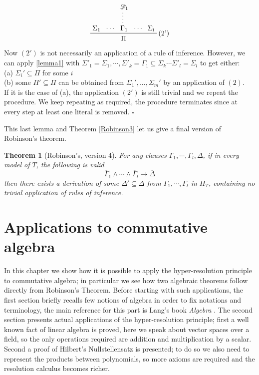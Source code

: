 \documentclass[a4paper,12pt,oneside]{book}
\newtheorem{theorem}{Theorem}[chapter]
\newcommand{\D}{\mathscr{D}}
\newcommand*{\QED}{\hfill\ensuremath{\square}}
\let\e\wedge
\begin{document}
\begin{equation*}
\prftree[r]{(2')}{\prfassumption{\Sigma_1}}{\cdots}
{\prfsummary{\D_1}{\Gamma_1}}
{\cdots}{\prfassumption{\Sigma_l}}{\Pi}
\end{equation*}
Now $(2')$ is not necessarily an application of a rule of inference. However, we can apply \ref{lemma1} with  $\Sigma'_1=\Sigma_1,\cdots, \Sigma'_k=\Gamma_1\subseteq\Sigma_k\cdots\Sigma'_l=\Sigma_l$ to get either:\\
(a) $\Sigma_i' \subseteq \Pi$ for some $i$\\
(b) some $\Pi '\subseteq\Pi$ can be obtained from $\Sigma_1 ',...,\Sigma_m '$ by an application of $(2)$.\\
If it is the case of (a), the application $(2')$ is still trivial and we repeat the procedure. We keep repeating as required, the procedure terminates since at every step at least one literal is removed. \QED



\noindent This last lemma and Theorem \ref{Robinson3}  let us give a final version of Robinson's theorem.
\begin{theorem}[{Robinson's, version 4}] \label{Robinson}
For any clauses $\Gamma_1, \cdots ,\Gamma_l , \Delta$, if in every model of $T$, the following is valid 
$$
\overline{\Gamma}_1\e\cdots\e\overline{\Gamma}_l \rightarrow \overline{\Delta}
$$
then there exists a derivation of some $\Delta' \subseteq \Delta$ from $\Gamma_1, \cdots ,\Gamma_l$ in $H_T$, containing no trivial application of rules of inference.
\end{theorem}


\chapter{Applications to commutative algebra} %
In this chapter we show how it is possible to apply the hyper-resolution principle to commutative algebra; in particular we see how two algebraic theorems follow directly from Robinson's Theorem. Before starting with such applications, the first section briefly recalls few notions of algebra in order to fix notations and terminology, the main reference for this part is Lang's book \textit{Algebra} \cite{Lang}.
The second section presents actual applications of the hyper-resolution principle; first a  well known fact of linear algebra is proved, here we speak about vector spaces over a field, so the only operations required are addition and multiplication by a scalar. 
Second a proof of Hilbert's Nullstellensatz is presented; to do so we also need to represent the products between polynomials, so more axioms are required and the resolution calculus becomes richer.
\end{document}
